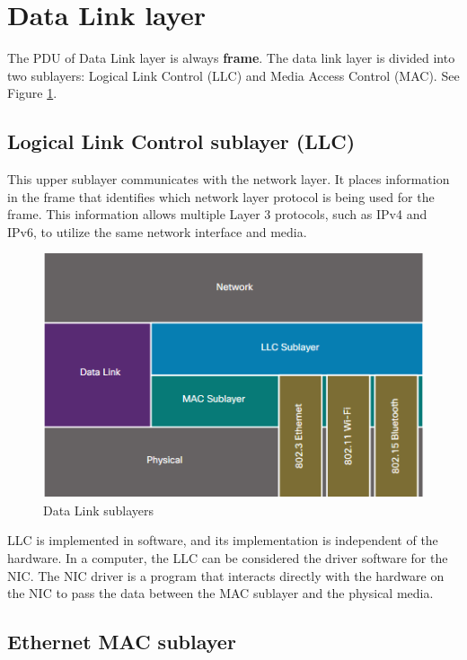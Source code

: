 {\section{Data Link layer}

The PDU of Data Link layer is always \textbf{frame}. The data link layer is divided into two sublayers: Logical Link Control (LLC) and Media Access Control (MAC). See Figure \ref{Sublayers}.

\subsection{Logical Link Control sublayer (LLC)}

This upper sublayer communicates with the network layer. It places information in the frame that identifies which network layer protocol is being used for the frame. This information allows multiple Layer 3 protocols, such as IPv4 and IPv6, to utilize the same network interface and media.\\

\begin{figure}[hbtp]
\caption{Data Link sublayers}\label{Sublayers}
\centering
\includegraphics[scale=0.7]{pictures/Sublayers.PNG}
\end{figure}

LLC is implemented in software, and its implementation is independent of the hardware. In a computer, the LLC can be considered the driver software for the NIC. The NIC driver is a program that interacts directly with the hardware on the NIC to pass the data between the MAC sublayer and the physical media.

\subsection{Ethernet MAC sublayer}

}
